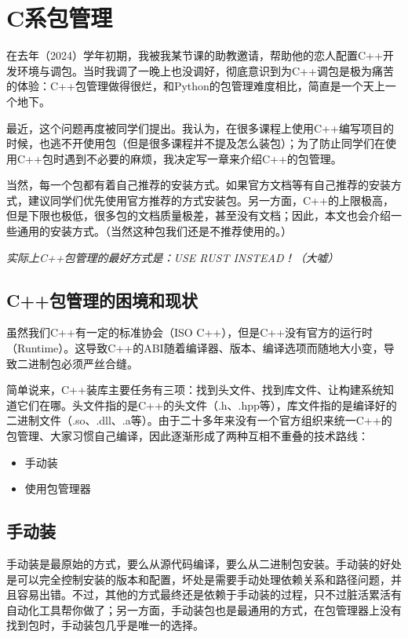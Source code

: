 \documentclass[../main]{subfiles}
\begin{document}
\chapter{C系包管理}

在去年（2024）学年初期，我被我某节课的助教邀请，帮助他的恋人配置C++开发环境与调包。当时我调了一晚上也没调好，彻底意识到为C++调包是极为痛苦的体验：C++包管理做得很烂，和Python的包管理难度相比，简直是一个天上一个地下。

最近，这个问题再度被同学们提出。我认为，在很多课程上使用C++编写项目的时候，也逃不开使用包（但是很多课程并不提及怎么装包）；为了防止同学们在使用C++包时遇到不必要的麻烦，我决定写一章来介绍C++的包管理。

当然，每一个包都有着自己推荐的安装方式。如果官方文档等有自己推荐的安装方式，建议同学们优先使用官方推荐的方式安装包。另一方面，C++的上限极高，但是下限也极低，很多包的文档质量极差，甚至没有文档；因此，本文也会介绍一些通用的安装方式。（当然这种包我们还是不推荐使用的。）

\emph{实际上C++包管理的最好方式是：USE RUST INSTEAD！（大嘘）}

\section{C++包管理的困境和现状}

虽然我们C++有一定的标准协会（ISO C++），但是C++没有官方的运行时（Runtime）。这导致C++的ABI随着编译器、版本、编译选项而随地大小变，导致二进制包必须严丝合缝。

简单说来，C++装库主要任务有三项：找到头文件、找到库文件、让构建系统知道它们在哪。头文件指的是C++的头文件（.h、.hpp等），库文件指的是编译好的二进制文件（.so、.dll、.a等）。由于二十多年来没有一个官方组织来统一C++的包管理、大家习惯自己编译，因此逐渐形成了两种互相不重叠的技术路线：
\begin{itemize}
  \item 手动装
  \item 使用包管理器
\end{itemize}

\section{手动装}

手动装是最原始的方式，要么从源代码编译，要么从二进制包安装。手动装的好处是可以完全控制安装的版本和配置，坏处是需要手动处理依赖关系和路径问题，并且容易出错。不过，其他的方式最终还是依赖于手动装的过程，只不过脏活累活有自动化工具帮你做了；另一方面，手动装包也是最通用的方式，在包管理器上没有找到包时，手动装包几乎是唯一的选择。
\end{document}
